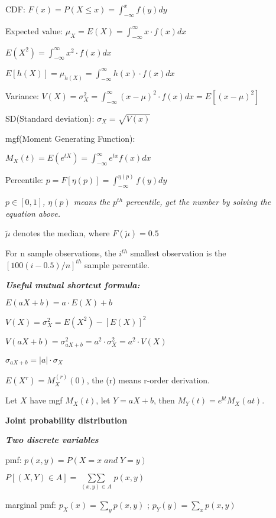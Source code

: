 \documentclass{article}
\newcommand{\bigtitle}[1]{
	\noindent
	\textbf{#1}
}
\newcommand{\smalltitle}[1]{
	\noindent
	\textbf{\textit{#1}}
}
\begin{document}
	CDF: $F(x) = P(X\leq x) = \int_{-\infty}^{x}f(y)dy$
	
	Expected value: $\mu_X = E(X) = \int_{-\infty}^{\infty} x\cdot f(x)dx$
	
	$E(X^2) = \int_{-\infty}^{\infty} x^2 \cdot f(x) dx$
	
	$E[h(X)] = \mu_{h(X)} = \int_{-\infty}^{\infty}h(x)\cdot f(x)dx$
	
	Variance: $V(X) = \sigma_X^2 = \int_{-\infty}^{\infty} (x-\mu)^2\cdot f(x)dx = E[(x-\mu)^2]$
	
	SD(Standard deviation): $\sigma_X = \sqrt{V(x)}$
	
	mgf(Moment Generating Function): 
	
	$M_X(t) = E(e^{tX}) = \int_{-\infty}^{\infty} e^{tx}f(x)dx$
	
	Percentile: $p = F[\eta(p)] = \int_{-\infty}^{\eta(p)}f(y)dy$
	
	\textit{$p \in [0,1]$, $\eta(p)$ means the $p^{th}$ percentile, get the number by solving the equation above.}
	
	$\tilde{\mu}$ denotes the median, where $F(\tilde{\mu}) = 0.5$ 
	
	For n sample observations, the $i^{th}$ smallest observation is the $[100(i-0.5)/n]^{th}$ sample percentile.
	
	
	
	\smalltitle{Useful mutual shortcut formula:}
	
	$E(aX+b) = a\cdot E(X) + b$
	
	$V(X) = \sigma_X^2 = E(X^2) - [E(X)]^2$
	
	$V(aX+b) = \sigma_{aX+b}^2 = a^2 \cdot \sigma_X^2 = a^2 \cdot V(X)$
	
	$\sigma_{aX+b} = \left|a\right| \cdot \sigma_X$
	
	$E(X^r) = M_X^{(r)}(0)$, the (r) means r-order derivation.
	
	\noindent
	Let $X$ have mgf $M_X(t)$, let $Y = aX+b$, then $M_Y(t) = e^{bt}M_X(at)$.
	
	
	\bigtitle{Joint probability distribution}
	
	
	\smalltitle{Two discrete variables}
	
	pmf: $p(x,y) = P(X=x\; and\; Y=y)$
	
	$P[(X,Y)\in A] = \mathop{\sum\sum} \limits_{(x,y)\in A} p(x,y)$
	
	marginal pmf:
	$p_X(x) = \sum \limits_{y}p(x,y) $ ; $ p_Y(y) = \sum \limits_{x}p(x,y)$
	
\end{document}

